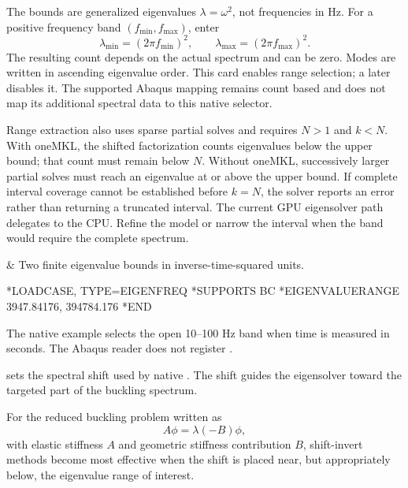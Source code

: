 The bounds are generalized eigenvalues \(\lambda=\omega^2\), not frequencies in Hz. For a positive frequency band \((f_{\min},f_{\max})\), enter
\[
\lambda_{\min}=(2\pi f_{\min})^2,\qquad
\lambda_{\max}=(2\pi f_{\max})^2.
\]
The resulting count depends on the actual spectrum and can be zero. Modes are written in ascending eigenvalue order. This card enables range selection; a later  disables it. The supported Abaqus  mapping remains count based and does not map its additional spectral data to this native selector.

Range extraction also uses sparse partial solves and requires \(N>1\) and \(k<N\). With oneMKL, the shifted factorization counts eigenvalues below the upper bound; that count must remain below \(N\). Without oneMKL, successively larger partial solves must reach an eigenvalue at or above the upper bound. If complete interval coverage cannot be established before \(k=N\), the solver reports an error rather than returning a truncated interval. The current GPU eigensolver path delegates to the CPU. Refine the model or narrow the interval when the band would require the complete spectrum.

\begin{keyworddata}
 & Two finite eigenvalue bounds in inverse-time-squared units. \\
\end{keyworddata}

\exampleheading
\begin{dialectexamples}
\begin{femasterdeck}
*LOADCASE, TYPE=EIGENFREQ
*SUPPORTS
BC
*EIGENVALUERANGE
3947.84176, 394784.176
*END
\end{femasterdeck}
\begin{noabaqus}
The native example selects the open 10--100 Hz band when time is measured in seconds. The Abaqus reader does not register .
\end{noabaqus}
\end{dialectexamples}


 sets the spectral shift used by native . The shift guides the eigensolver toward the targeted part of the buckling spectrum.

For the reduced buckling problem written as
\[
A\phi=\lambda(-B)\phi,
\]
with elastic stiffness \(A\) and geometric stiffness contribution \(B\), shift-invert methods become most effective when the shift is placed near, but appropriately below, the eigenvalue range of interest.

